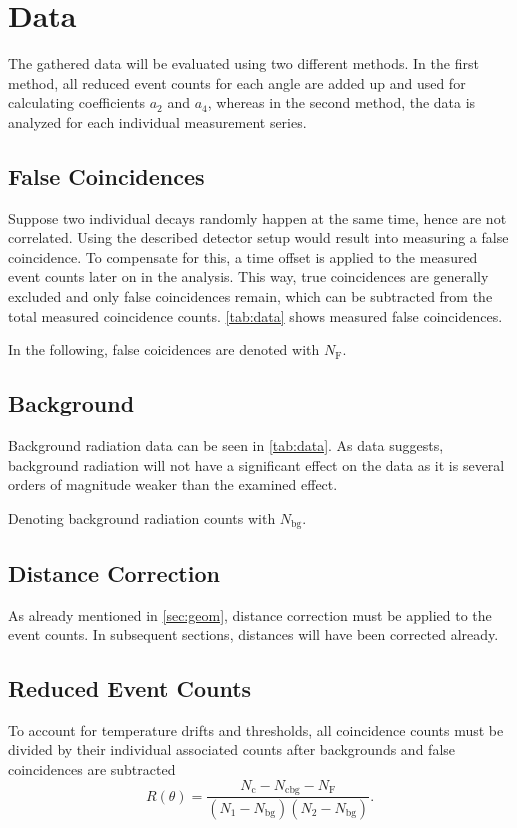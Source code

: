 \chapter{Data}
The gathered data will be evaluated using two different methods.
In the first method, all reduced event counts for each angle are added up and used for calculating coefficients $a_2$ and $a_4$,
whereas in the second method, the data is analyzed for each individual measurement series.

\section{False Coincidences}
Suppose two individual decays randomly happen at the same time, hence are not correlated.
Using the described detector setup would result into measuring a false coincidence.
To compensate for this, a time offset is applied to the measured event counts later on in the analysis.
This way, true coincidences are generally excluded and only false coincidences remain, which can be subtracted from the total measured coincidence counts.
\autoref{tab:data} shows measured false coincidences.

In the following, false coicidences are denoted with $N_\text{F}$.

\section{Background}\label{sec:bg}
Background radiation data can be seen in \autoref{tab:data}.
As data suggests, background radiation will not have a significant effect on the data as it is several orders of magnitude weaker than the examined effect.

Denoting background radiation counts with $N_\text{bg}$.

\section{Distance Correction}
As already mentioned in \autoref{sec:geom}, distance correction must be applied to the event counts.
In subsequent sections, distances will have been corrected already.

\section{Reduced Event Counts}
To account for temperature drifts and thresholds, all coincidence counts must be divided by their individual associated counts after backgrounds and false coincidences are subtracted
\begin{equation}\label{eq:red}
	R(\theta)=\frac{N_\text{c}-N_\text{cbg}-N_\text{F}}{(N_1-N_\text{bg})(N_2-N_\text{bg})}.
\end{equation}

